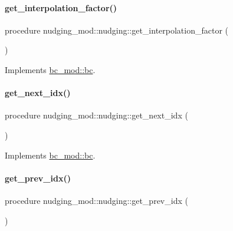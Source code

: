 \paragraph{\texorpdfstring{get\+\_\+interpolation\+\_\+factor()}{get\_interpolation\_factor()}}
{\footnotesize\ttfamily procedure nudging\+\_\+mod\+::nudging\+::get\+\_\+interpolation\+\_\+factor (\begin{DoxyParamCaption}{ }\end{DoxyParamCaption})\hspace{0.3cm}{\ttfamily [private]}}



Implements \mbox{\hyperlink{structbc__mod_1_1bc_a1d7f33a1fd0c18e5ce50af4690c82846}{bc\+\_\+mod\+::bc}}.

\mbox{\label{structnudging__mod_1_1nudging_afd2889fe6e9aa9560ebb2358efba4dec}} 
\paragraph{\texorpdfstring{get\+\_\+next\+\_\+idx()}{get\_next\_idx()}}
{\footnotesize\ttfamily procedure nudging\+\_\+mod\+::nudging\+::get\+\_\+next\+\_\+idx (\begin{DoxyParamCaption}{ }\end{DoxyParamCaption})\hspace{0.3cm}{\ttfamily [private]}}



Implements \mbox{\hyperlink{structbc__mod_1_1bc_abf0c1a16ec610ce08ed379315afc7f55}{bc\+\_\+mod\+::bc}}.

\mbox{\label{structnudging__mod_1_1nudging_ad1d7271784597d454bc97108232613cd}} 
\paragraph{\texorpdfstring{get\+\_\+prev\+\_\+idx()}{get\_prev\_idx()}}
{\footnotesize\ttfamily procedure nudging\+\_\+mod\+::nudging\+::get\+\_\+prev\+\_\+idx (\begin{DoxyParamCaption}{ }\end{DoxyParamCaption})\hspace{0.3cm}{\ttfamily [private]}}



